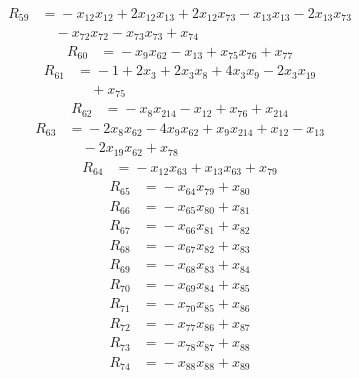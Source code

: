 \begin{align*}
R_{59}&={}-x_{12}x_{12} +2x_{12}x_{13} +2x_{12}x_{73} -x_{13}x_{13} -2x_{13}x_{73}\\
&\quad{}-x_{72}x_{72} -x_{73}x_{73} +x_{74}
\end{align*}
\begin{align*}
R_{60}&={}-x_{9}x_{62} -x_{13} +x_{75}x_{76} +x_{77}
\end{align*}
\begin{align*}
R_{61}&={}-1 +2x_{3} +2x_{3}x_{8} +4x_{3}x_{9} -2x_{3}x_{19}\\
&\quad{}+x_{75}
\end{align*}
\begin{align*}
R_{62}&={}-x_{8}x_{214} -x_{12} +x_{76} +x_{214}
\end{align*}
\begin{align*}
R_{63}&={}-2x_{8}x_{62} -4x_{9}x_{62} +x_{9}x_{214} +x_{12} -x_{13}\\
&\quad{}-2x_{19}x_{62} +x_{78}
\end{align*}
\begin{align*}
R_{64}&={}-x_{12}x_{63} +x_{13}x_{63} +x_{79}
\end{align*}
\begin{align*}
R_{65}&={}-x_{64}x_{79} +x_{80}
\end{align*}
\begin{align*}
R_{66}&={}-x_{65}x_{80} +x_{81}
\end{align*}
\begin{align*}
R_{67}&={}-x_{66}x_{81} +x_{82}
\end{align*}
\begin{align*}
R_{68}&={}-x_{67}x_{82} +x_{83}
\end{align*}
\begin{align*}
R_{69}&={}-x_{68}x_{83} +x_{84}
\end{align*}
\begin{align*}
R_{70}&={}-x_{69}x_{84} +x_{85}
\end{align*}
\begin{align*}
R_{71}&={}-x_{70}x_{85} +x_{86}
\end{align*}
\begin{align*}
R_{72}&={}-x_{77}x_{86} +x_{87}
\end{align*}
\begin{align*}
R_{73}&={}-x_{78}x_{87} +x_{88}
\end{align*}
\begin{align*}
R_{74}&={}-x_{88}x_{88} +x_{89}
\end{align*}
